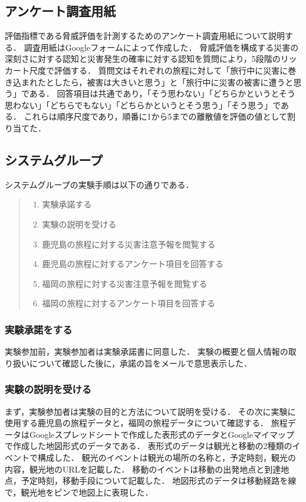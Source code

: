\newpage

\subsection{アンケート調査用紙}
評価指標である脅威評価を計測するためのアンケート調査用紙について説明する．
調査用紙はGoogleフォームによって作成した．
脅威評価を構成する災害の深刻さに対する認知と災害発生の確率に対する認知を質問により，5段階のリッカート尺度で評価する．
質問文はそれぞれの旅程に対して「旅行中に災害に巻き込まれたとしたら，被害は大きいと思う」と「旅行中に災害の被害に遭うと思う」である．
回答項目は共通であり，「そう思わない」「どちらかというとそう思わない」「どちらでもない」「どちらかというとそう思う」「そう思う」である．
これらは順序尺度であり，順番に1から5までの離散値を評価の値として割り当てた．

\subsection{システムグループ}
システムグループの実験手順は以下の通りである．

\begin{quote}
  \begin{enumerate}
    \item 実験承諾する
    \item 実験の説明を受ける
    \item 鹿児島の旅程に対する災害注意予報を閲覧する
    \item 鹿児島の旅程に対するアンケート項目を回答する
    \item 福岡の旅程に対する災害注意予報を閲覧する
    \item 福岡の旅程に対するアンケート項目を回答する
  \end{enumerate}
\end{quote}

\subsubsection{実験承諾をする}
実験参加前，実験参加者は実験承諾書に同意した．
実験の概要と個人情報の取り扱いについて確認した後に，承諾の旨をメールで意思表示した．

\subsubsection{実験の説明を受ける}
まず，実験参加者は実験の目的と方法について説明を受ける．
その次に実験に使用する鹿児島の旅程データと，福岡の旅程データについて確認する．
旅程データはGoogleスプレッドシートで作成した表形式のデータとGoogleマイマップで作成した地図形式のデータである．
表形式のデータは観光と移動の2種類のイベントで構成した．
観光のイベントは観光の場所の名称と，予定時刻，観光の内容，観光地のURLを記載した．
移動のイベントは移動の出発地点と到達地点，予定時刻，移動手段について記載した．
地図形式のデータは移動経路を線で，観光地をピンで地図上に表現した．

